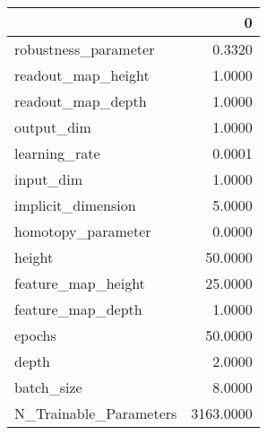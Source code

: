 \begin{tabular}{lr}
\toprule
{} &          0 \\
\midrule
robustness\_parameter   &     0.3320 \\
readout\_map\_height     &     1.0000 \\
readout\_map\_depth      &     1.0000 \\
output\_dim             &     1.0000 \\
learning\_rate          &     0.0001 \\
input\_dim              &     1.0000 \\
implicit\_dimension     &     5.0000 \\
homotopy\_parameter     &     0.0000 \\
height                 &    50.0000 \\
feature\_map\_height     &    25.0000 \\
feature\_map\_depth      &     1.0000 \\
epochs                 &    50.0000 \\
depth                  &     2.0000 \\
batch\_size             &     8.0000 \\
N\_Trainable\_Parameters &  3163.0000 \\
\bottomrule
\end{tabular}
